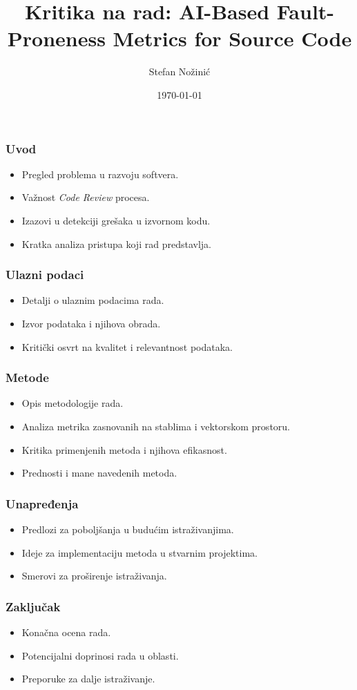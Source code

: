 \documentclass{beamer}
\title[Kritika: AI-Based Fault-Proneness Metrics]{Kritika na rad: AI-Based Fault-Proneness Metrics for Source Code}
\institute{Univerzitet u Novom Sadu}
\author{Stefan Nožinić}
\date{\today}
\begin{document}
\begin{frame}
  \titlepage
\end{frame}

\begin{frame}
\frametitle{Uvod}
\begin{itemize}
    \item Pregled problema u razvoju softvera.
    \item Važnost \textit{Code Review} procesa.
    \item Izazovi u detekciji grešaka u izvornom kodu.
    \item Kratka analiza pristupa koji rad predstavlja.
\end{itemize}
\end{frame}

\begin{frame}
\frametitle{Ulazni podaci}
\begin{itemize}
    \item Detalji o ulaznim podacima rada.
    \item Izvor podataka i njihova obrada.
    \item Kritički osvrt na kvalitet i relevantnost podataka.
\end{itemize}
\end{frame}

\begin{frame}
\frametitle{Metode}
\begin{itemize}
    \item Opis metodologije rada.
    \item Analiza metrika zasnovanih na stablima i vektorskom prostoru.
    \item Kritika primenjenih metoda i njihova efikasnost.
    \item Prednosti i mane navedenih metoda.
\end{itemize}
\end{frame}

\begin{frame}
\frametitle{Unapređenja}
\begin{itemize}
    \item Predlozi za poboljšanja u budućim istraživanjima.
    \item Ideje za implementaciju metoda u stvarnim projektima.
    \item Smerovi za proširenje istraživanja.
\end{itemize}
\end{frame}

\begin{frame}
\frametitle{Zaključak}
\begin{itemize}
    \item Konačna ocena rada.
    \item Potencijalni doprinosi rada u oblasti.
    \item Preporuke za dalje istraživanje.
\end{itemize}
\end{frame}
\end{document}
